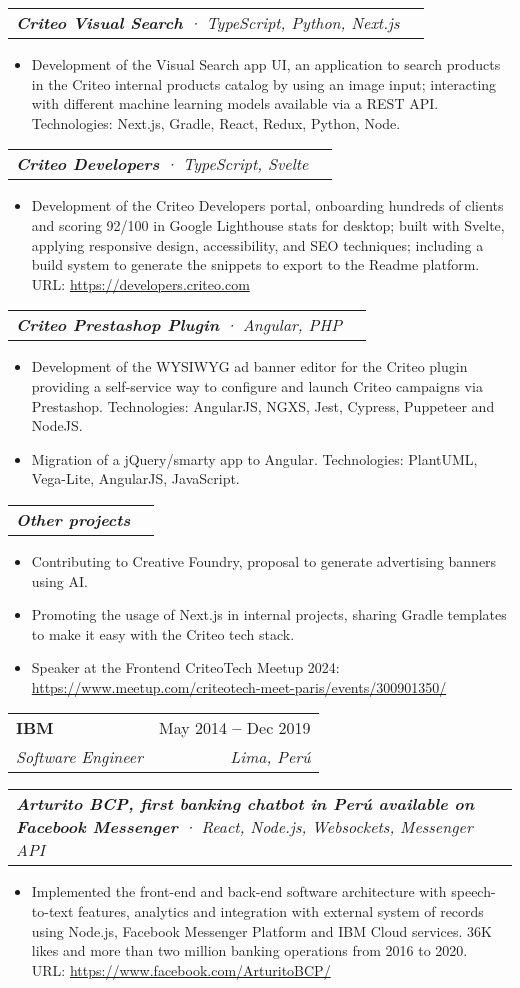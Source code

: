 \documentclass[letterpaper,11pt]{article}
\makeatletter
\newcommand{\resumeItem}[1]{
  \item\small{
    {#1 \vspace{-2pt}}
  }
}
\newcommand{\resumeSubheading}[4]{
  \vspace{-4pt}\item
    \begin{tabular*}{0.97\textwidth}[t]{l@{\extracolsep{\fill}}r}
      \textbf{#1} & \small#2 \\
      \textit{\small#3} & \textit{\small #4} \\
    \end{tabular*}\vspace{-7pt}
}
\newcommand{\resumeSubSubheading}[2]{
    \vspace{-2pt}\item
    \begin{tabular*}{0.97\textwidth}{l@{\extracolsep{\fill}}r}
      \textit{\small#1} & \textit{\small #2} \\
    \end{tabular*}\vspace{-7pt}
}
\newcommand{\resumeItemListStart}{\begin{itemize}}
\newcommand{\resumeItemListEnd}{\end{itemize}\vspace{-5pt}}
\makeatother
\begin{document}
      \resumeSubSubheading{\textbf{Criteo Visual Search} · TypeScript, Python, Next.js }{}
        \resumeItemListStart
          \resumeItem{Development of the Visual Search app UI, an application to search products in the Criteo internal products catalog by using an image input; interacting with different machine learning models available via a REST API.
          Technologies: Next.js, Gradle, React, Redux, Python, Node.}
          \resumeItemListEnd

    \resumeSubSubheading{\textbf{Criteo Developers} · TypeScript, Svelte }{}
      \resumeItemListStart
        \resumeItem{Development of the Criteo Developers portal, onboarding hundreds of clients and scoring 92/100 in Google Lighthouse stats for desktop; built with Svelte, applying responsive design, accessibility, and SEO techniques; including a build system to generate the snippets to export to the Readme platform.
        \\[1.5pt]
        URL: {\href{https://developers.criteo.com}{\color{blue}https://developers.criteo.com}}
        }
      \resumeItemListEnd

    \resumeSubSubheading{\textbf{Criteo Prestashop Plugin} · Angular, PHP}{}
      \resumeItemListStart
        \resumeItem{Development of the WYSIWYG ad banner editor for the Criteo plugin providing a self-service way to configure and launch Criteo campaigns via Prestashop. Technologies: AngularJS, NGXS, Jest, Cypress, Puppeteer and NodeJS.}
        \resumeItem{Migration of a jQuery/smarty app to Angular. Technologies: PlantUML, Vega-Lite, AngularJS, JavaScript.}
      \resumeItemListEnd

    \resumeSubSubheading{\textbf{Other projects} }{}
      \resumeItemListStart
        \resumeItem{Contributing to Creative Foundry, proposal to generate advertising banners using AI.}
        \resumeItem{Promoting the usage of Next.js in internal projects, sharing Gradle templates to make it easy with the Criteo tech stack.}
        \resumeItem{Speaker at the Frontend CriteoTech Meetup 2024: {\href{https://www.meetup.com/criteotech-meet-paris/events/300901350/}{\color{blue}https://www.meetup.com/criteotech-meet-paris/events/300901350/}}}
      \resumeItemListEnd

    \resumeSubheading
    {IBM}{May 2014 \textbf{--} Dec 2019}
    {Software Engineer}{Lima, Perú}
    \vspace{8pt}

      \resumeSubSubheading{\textbf{Arturito BCP, first banking chatbot in Perú available on Facebook Messenger} · React, Node.js, Websockets, Messenger API}{}
        \resumeItemListStart
          \resumeItem{Implemented the front-end and back-end software architecture with speech-to-text features, analytics and integration with external system of records using Node.js, Facebook Messenger Platform and IBM Cloud services. 36K likes and more than two million banking operations from 2016 to 2020.
          \\[1.5pt] URL: {\href{https://www.facebook.com/ArturitoBCP/}{\color{blue}https://www.facebook.com/ArturitoBCP/}}
          }
        \resumeItemListEnd
\end{document}

